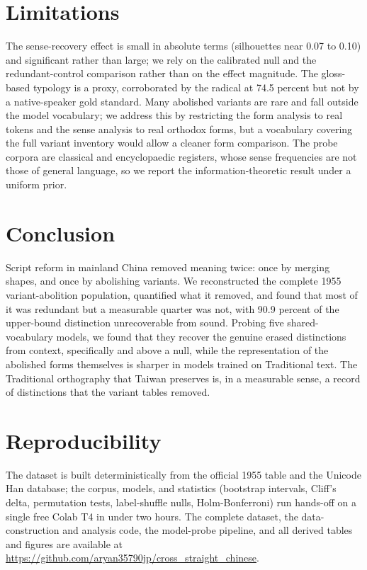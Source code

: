 \documentclass[10pt,twocolumn]{article}
\begin{document}
\section{Limitations}
The sense-recovery effect is small in absolute terms (silhouettes near 0.07 to
0.10) and significant rather than large; we rely on the calibrated null and the
redundant-control comparison rather than on the effect magnitude. The gloss-based typology is a proxy,
corroborated by the radical at 74.5 percent but not by a native-speaker gold
standard. Many abolished variants are rare and fall outside the model vocabulary;
we address this by restricting the form analysis to real tokens and the sense
analysis to real orthodox forms, but a vocabulary covering the full variant
inventory would allow a cleaner form comparison. The probe corpora are classical
and encyclopaedic registers, whose sense frequencies are not those of general
language, so we report the information-theoretic result under a uniform prior.

\section{Conclusion}
Script reform in mainland China removed meaning twice: once by merging shapes, and
once by abolishing variants. We reconstructed the complete 1955 variant-abolition
population, quantified what it removed, and found that most of it was redundant
but a measurable quarter was not, with 90.9 percent of the upper-bound distinction
unrecoverable from sound. Probing five shared-vocabulary models, we found that
they recover the genuine erased distinctions from context, specifically and above
a null, while the representation of the abolished forms themselves is sharper in
models trained on Traditional text. The Traditional orthography that Taiwan
preserves is, in a measurable sense, a record of distinctions that the variant
tables removed.

\section*{Reproducibility}
The dataset is built deterministically from the official 1955 table and the
Unicode Han database; the corpus, models, and statistics (bootstrap intervals,
Cliff's delta, permutation tests, label-shuffle nulls, Holm-Bonferroni) run
hands-off on a single free Colab T4 in under two hours. The complete dataset,
the data-construction and analysis code, the model-probe pipeline, and all
derived tables and figures are available at
\url{https://github.com/aryan35790jp/cross_straight_chinese}.
\end{document}
